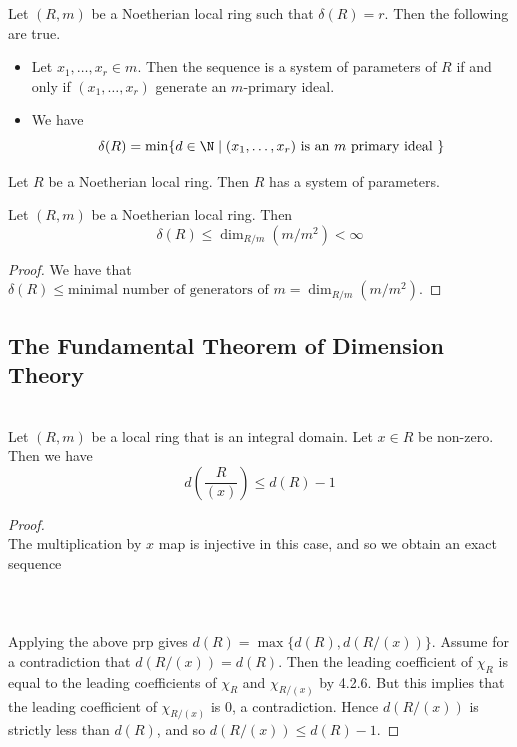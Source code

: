 \documentclass[a4paper]{article}
\begin{document}
\begin{lmm}{}{} Let $(R,m)$ be a Noetherian local ring such that $\delta(R)=r$. Then the following are true. 
\begin{itemize}
\item Let $x_1,\dots,x_r\in m$. Then the sequence is a system of parameters of $R$ if and only if $(x_1,\dots,x_r)$ generate an $m$-primary ideal. 
\item We have $$\delta(R)=\min\{d\in\N\;|\;(x_1,\dots,x_r)\text{ is an }m\text{ primary ideal }\}$$
\end{itemize}
\end{lmm}

\begin{lmm}{}{} Let $R$ be a Noetherian local ring. Then $R$ has a system of parameters. 
\end{lmm}

\begin{prp}{}{} Let $(R,m)$ be a Noetherian local ring. Then $$\delta(R)\leq\dim_{R/m}(m/m^2)<\infty$$ 
\begin{proof}
We have that $\delta(R)\leq\text{minimal number of generators of }m=\dim_{R/m}(m/m^2)$. 
\end{proof}
\end{prp}

\subsection{The Fundamental Theorem of Dimension Theory}
\begin{lmm}{}{}\\
Let $(R,m)$ be a local ring that is an integral domain. Let $x\in R$ be non-zero. Then we have $$d\left(\frac{R}{(x)}\right)\leq d(R)-1$$ 
\begin{proof}\\
The multiplication by $x$ map is injective in this case, and so we obtain an exact sequence \\~\\
\\~\\
Applying the above prp gives $d(R)=\max\{d(R),d(R/(x))\}$. Assume for a contradiction that $d(R/(x))=d(R)$. Then the leading coefficient of $\chi_R$ is equal to the leading coefficients of $\chi_R$ and $\chi_{R/(x)}$ by 4.2.6. But this implies that the leading coefficient of $\chi_{R/(x)}$ is $0$, a contradiction. Hence $d(R/(x))$ is strictly less than $d(R)$, and so $d(R/(x))\leq d(R)-1$. 
\end{proof}
\end{lmm}
\end{document}
